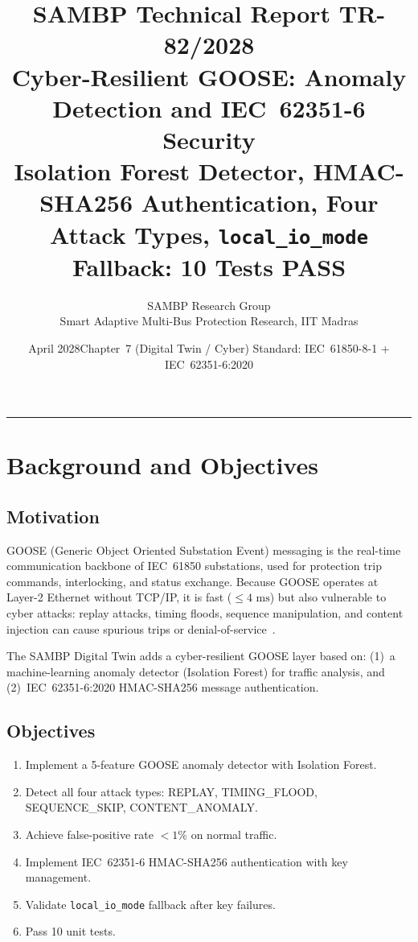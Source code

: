 \documentclass[11pt, a4paper]{article}
\title{\textbf{\textsf{\color{sambpblue}SAMBP Technical Report TR-82/2028}}\\[6pt]
  \Large Cyber-Resilient GOOSE: Anomaly Detection and IEC~62351-6 Security\\[4pt]
  \normalsize Isolation Forest Detector, HMAC-SHA256 Authentication,
  Four Attack Types, \texttt{local\_io\_mode} Fallback: 10 Tests PASS}
\author{SAMBP Research Group\\[2pt]
  \small Smart Adaptive Multi-Bus Protection Research, IIT Madras}
\date{April 2028\quad\textbar\quad Chapter~7 (Digital Twin / Cyber)\quad\textbar\quad
  Standard: IEC~61850-8-1 + IEC~62351-6:2020}
\newcommand{\ms}{\,\text{ms}}
\begin{document}
\maketitle
\tableofcontents
\vspace{6pt}\hrule\vspace{10pt}

\section{Background and Objectives}
\label{sec:background}

\subsection{Motivation}

GOOSE (Generic Object Oriented Substation Event) messaging is the
real-time communication backbone of IEC~61850 substations, used for
protection trip commands, interlocking, and status exchange.
Because GOOSE operates at Layer-2 Ethernet without TCP/IP,
it is fast ($\leq 4\,\ms$) but also vulnerable to cyber attacks:
replay attacks, timing floods, sequence manipulation, and content injection
can cause spurious trips or denial-of-service~\cite{Hong2014}.

The SAMBP Digital Twin adds a cyber-resilient GOOSE layer based on:
(1)~a machine-learning anomaly detector (Isolation Forest) for traffic
analysis, and (2)~IEC~62351-6:2020 HMAC-SHA256 message authentication.

\subsection{Objectives}

\begin{enumerate}
  \item Implement a 5-feature GOOSE anomaly detector with Isolation Forest.
  \item Detect all four attack types: REPLAY, TIMING\_FLOOD,
    SEQUENCE\_SKIP, CONTENT\_ANOMALY.
  \item Achieve false-positive rate $< 1\%$ on normal traffic.
  \item Implement IEC~62351-6 HMAC-SHA256 authentication with key management.
  \item Validate \texttt{local\_io\_mode} fallback after key failures.
  \item Pass 10 unit tests.
\end{enumerate}
\end{document}
